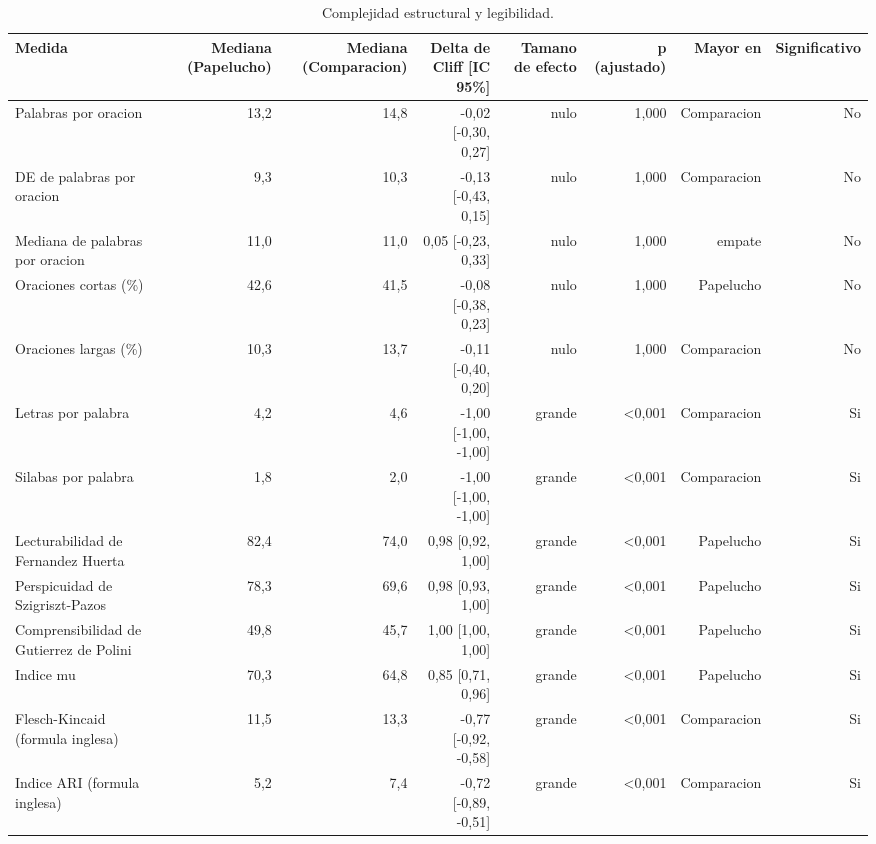\begin{table}[htbp]
\centering
\small
\caption{Complejidad estructural y legibilidad.}
\label{tab:readability-results-es}
\begin{tabular}{lrrrrrrr}
\toprule
\textbf{Medida} & \textbf{Mediana (Papelucho)} & \textbf{Mediana (Comparacion)} & \textbf{Delta de Cliff [IC 95\%]} & \textbf{Tamano de efecto} & \textbf{p (ajustado)} & \textbf{Mayor en} & \textbf{Significativo} \\
\midrule
Palabras por oracion & 13,2 & 14,8 & -0,02 [-0,30, 0,27] & nulo & 1,000 & Comparacion & No \\
DE de palabras por oracion & 9,3 & 10,3 & -0,13 [-0,43, 0,15] & nulo & 1,000 & Comparacion & No \\
Mediana de palabras por oracion & 11,0 & 11,0 & 0,05 [-0,23, 0,33] & nulo & 1,000 & empate & No \\
Oraciones cortas (\%) & 42,6 & 41,5 & -0,08 [-0,38, 0,23] & nulo & 1,000 & Papelucho & No \\
Oraciones largas (\%) & 10,3 & 13,7 & -0,11 [-0,40, 0,20] & nulo & 1,000 & Comparacion & No \\
Letras por palabra & 4,2 & 4,6 & -1,00 [-1,00, -1,00] & grande & <0,001 & Comparacion & Si \\
Silabas por palabra & 1,8 & 2,0 & -1,00 [-1,00, -1,00] & grande & <0,001 & Comparacion & Si \\
Lecturabilidad de Fernandez Huerta & 82,4 & 74,0 & 0,98 [0,92, 1,00] & grande & <0,001 & Papelucho & Si \\
Perspicuidad de Szigriszt-Pazos & 78,3 & 69,6 & 0,98 [0,93, 1,00] & grande & <0,001 & Papelucho & Si \\
Comprensibilidad de Gutierrez de Polini & 49,8 & 45,7 & 1,00 [1,00, 1,00] & grande & <0,001 & Papelucho & Si \\
Indice mu & 70,3 & 64,8 & 0,85 [0,71, 0,96] & grande & <0,001 & Papelucho & Si \\
Flesch-Kincaid (formula inglesa) & 11,5 & 13,3 & -0,77 [-0,92, -0,58] & grande & <0,001 & Comparacion & Si \\
Indice ARI (formula inglesa) & 5,2 & 7,4 & -0,72 [-0,89, -0,51] & grande & <0,001 & Comparacion & Si \\
\bottomrule
\end{tabular}
\end{table}


